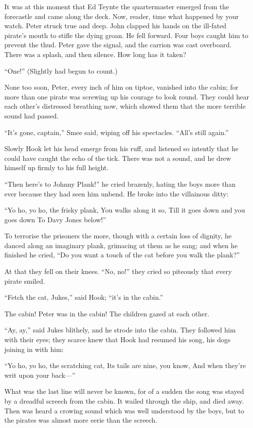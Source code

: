 It was at this moment that Ed Teynte the quartermaster emerged from the
forecastle and came along the deck. Now, reader, time what happened by
your watch. Peter struck true and deep. John clapped his hands on the
ill-fated pirate's mouth to stifle the dying groan. He fell forward.
Four boys caught him to prevent the thud. Peter gave the signal, and
the carrion was cast overboard. There was a splash, and then silence.
How long has it taken?

``One!'' (Slightly had begun to count.)

None too soon, Peter, every inch of him on tiptoe, vanished into the
cabin; for more than one pirate was screwing up his courage to look
round. They could hear each other's distressed breathing now, which
showed them that the more terrible sound had passed.

``It's gone, captain,'' Smee said, wiping off his spectacles. ``All's
still again.''

Slowly Hook let his head emerge from his ruff, and listened so intently
that he could have caught the echo of the tick. There was not a sound,
and he drew himself up firmly to his full height.

``Then here's to Johnny Plank!'' he cried brazenly, hating the boys more
than ever because they had seen him unbend. He broke into the
villainous ditty:

``Yo ho, yo ho, the frisky plank,
    You walks along it so,
Till it goes down and you goes down
    To Davy Jones below!''

To terrorise the prisoners the more, though with a certain loss of
dignity, he danced along an imaginary plank, grimacing at them as he
sang; and when he finished he cried, ``Do you want a touch of the cat
before you walk the plank?''

At that they fell on their knees. ``No, no!'' they cried so piteously
that every pirate smiled.

``Fetch the cat, Jukes,'' said Hook; ``it's in the cabin.''

The cabin! Peter was in the cabin! The children gazed at each other.

``Ay, ay,'' said Jukes blithely, and he strode into the cabin. They
followed him with their eyes; they scarce knew that Hook had resumed
his song, his dogs joining in with him:

``Yo ho, yo ho, the scratching cat,
    Its tails are nine, you know,
And when they're writ upon your back---''

What was the last line will never be known, for of a sudden the song
was stayed by a dreadful screech from the cabin. It wailed through the
ship, and died away. Then was heard a crowing sound which was well
understood by the boys, but to the pirates was almost more eerie than
the screech.


